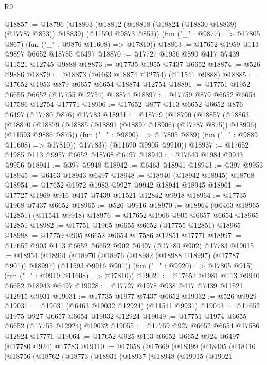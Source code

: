 \begin{lexlean}{R9}
\begin{coremodule}
{{{{{{{{{{{{{{{{{{{{{{{{{{{{{{{{{{{{{{{{{{{{{{{{{{{{{{{{{{{{{{{{{{{{{{{{{{{{{{{{{{{{@18857 := @18796
    (@18803
      (@18812 (@18818 (@18824 (@18830 @18839) (@17787 @853)) @18839) (@11593 @9873 @853))
      (fun ("_" : @9877) => @17805 @867)
      (fun ("_" : @9876 @11608) => @17810))
@18863 := @17652 @1959 @113 @9897 @6652 @18785 @6497
@18870 := @17727 @1956 @890 @417 @7439 @11521 @12745 @9888
@18873 := @17735 @1955 @7437 @6652
@18874 := @526 @9886
@18879 := @18873 (@6463 @18874 @12754) (@11541 @9888)
@18885 := @17652 @1953 @879 @6657 @6654 @18874 @12754
@18891 := @17751 @1952 @6655 @6652 (@17755 @12754) @18874
@18897 := @17759 @879 @6652 @6654 @17586 @12754 @17771
@18906 := @17652 @877 @113 @6652 @6652 @876 @6497 (@17780 @876) @17783
@18931 := @18779
    (@18790
      (@18857
        (@18863
          (@18870
            (@18879 (@18885 (@18891 (@18897 @18906) (@17787 @875)) @18906) (@11593 @9886 @875))
            (fun ("_" : @9890) => @17805 @889)
            (fun ("_" : @9889 @11608) => @17810))
          @17783))
      (@11690 @9905 @9910))
@18937 := @17652 @1985 @113 @9957 @6652 @18768 @6497
@18940 := @17640 @1984 @9943 @9956
@18941 := @397 @9948
@18942 := @6463 @18941
@18943 := @397 @9953
@18945 := @6463 @18943 @6497
@18948 := @18940 (@18942 @18945) @18768
@18954 := @17652 @1972 @1983 @9927 @9942 @18941 @18945
@18961 := @17727 @1969 @916 @417 @7439 @11521 @12842 @9918
@18964 := @17735 @1968 @7437 @6652
@18965 := @526 @9916
@18970 := @18964 (@6463 @18965 @12851) (@11541 @9918)
@18976 := @17652 @1966 @905 @6657 @6654 @18965 @12851
@18982 := @17751 @1965 @6655 @6652 (@17755 @12851) @18965
@18988 := @17759 @905 @6652 @6654 @17586 @12851 @17771
@18997 := @17652 @903 @113 @6652 @6652 @902 @6497 (@17780 @902) @17783
@19015 := @18954
    (@18961
      (@18970 (@18976 (@18982 (@18988 @18997) (@17787 @901)) @18997) (@11593 @9916 @901))
      (fun ("_" : @9920) => @17805 @915)
      (fun ("_" : @9919 @11608) => @17810))
@19021 := @17652 @1981 @113 @9940 @6652 @18943 @6497
@19028 := @17727 @1978 @938 @417 @7439 @11521 @12915 @9931
@19031 := @17735 @1977 @7437 @6652
@19032 := @526 @9929
@19037 := @19031 (@6463 @19032 @12924) (@11541 @9931)
@19043 := @17652 @1975 @927 @6657 @6654 @19032 @12924
@19049 := @17751 @1974 @6655 @6652 (@17755 @12924) @19032
@19055 := @17759 @927 @6652 @6654 @17586 @12924 @17771
@19064 := @17652 @925 @113 @6652 @6652 @924 @6497 (@17780 @924) @17783
@19110 := @17658
    (@17669
      (@18399
        (@18405
          (@18416
            (@18756
              (@18762
                (@18773
                  (@18931
                    (@18937
                      (@18948
                        (@19015
                          (@19021
}}}}}}}}}}}}}}}}}}}}}}}}}}}}}}}}}}}}}}}}}}}}}}}}}}}}}}}}}}}}}}}}}}}}}}}}}}}}}}}}}}}}
\end{coremodule}
\end{lexlean}
